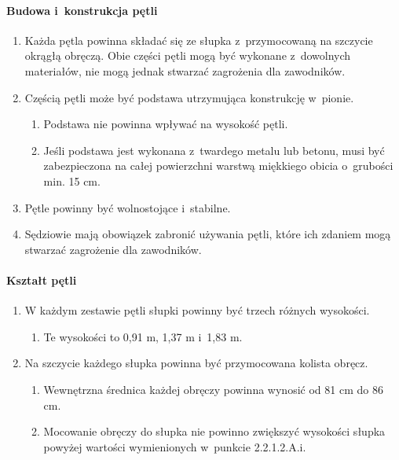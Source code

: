\documentclass[12pt,a4paper]{article}
\begin{document}
\paragraph{Budowa i~konstrukcja pętli}
\begin{enumerate}
	\item Każda pętla powinna składać się ze słupka z~przymocowaną na szczycie
	      okrągłą obręczą. Obie części pętli mogą być wykonane z~dowolnych
	      materiałów, nie mogą jednak stwarzać zagrożenia dla zawodników.

	\item Częścią pętli może być podstawa utrzymująca konstrukcję w~pionie.
	      \begin{enumerate}
		      \item Podstawa nie powinna wpływać na wysokość pętli.

		      \item Jeśli podstawa jest wykonana z~twardego metalu lub betonu, musi być
		            zabezpieczona na całej powierzchni warstwą miękkiego obicia o~grubości
		            min. 15 cm.
	      \end{enumerate}

	\item Pętle powinny być wolnostojące i~stabilne.

	\item Sędziowie mają obowiązek zabronić używania pętli, które ich zdaniem
	      mogą stwarzać zagrożenie dla zawodników.
\end{enumerate}

\paragraph{Kształt pętli}
\begin{enumerate}
	\item W każdym zestawie pętli słupki powinny być trzech różnych wysokości.
	      \begin{enumerate}
		      \item Te wysokości to 0,91 m, 1,37 m i~1,83 m.
	      \end{enumerate}
	\item Na szczycie każdego słupka powinna być przymocowana kolista obręcz.
	      \begin{enumerate}
		      \item Wewnętrzna średnica każdej obręczy powinna wynosić od 81 cm do 86 cm.

		      \item Mocowanie obręczy do słupka nie powinno zwiększyć wysokości słupka
		            powyżej wartości wymienionych w~punkcie 2.2.1.2.A.i.
	      \end{enumerate}
\end{enumerate}
\end{document}
